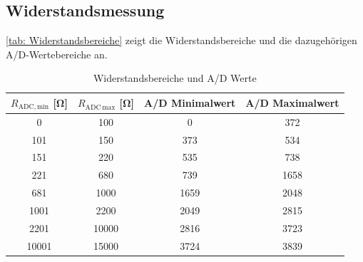 \subsection{Widerstandsmessung}
\autoref{tab: Widerstandsbereiche} zeigt die Widerstandsbereiche und die dazugehörigen A/D-Wertebereiche an.
\begin{table}[htb]
    \centering
    \caption{Widerstandsbereiche und A/D Werte}
    \label{tab: Widerstandsbereiche}
    \begin{tabular}{cccc}
        \toprule
        $R_{\text{ADC,}\,\text{min}}$ [\si{\ohm}]& $R_{\text{ADC}\, \text{max}}$  [\si{\ohm}] & A/D Minimalwert & A/D Maximalwert\\
        \midrule
        \num{0} & \num{100} & \num{0} & \num{372}\\
        \num{101} & \num{150} & \num{373} & \num{534}\\
        \num{151} & \num{220} & \num{535} & \num{738}\\
		\num{221} & \num{680} & \num{739} & \num{1658}\\
		\num{681} & \num{1000} & \num{1659} & \num{2048}\\
		\num{1001} & \num{2200} & \num{2049} & \num{2815}\\
		\num{2201} & \num{10000} & \num{2816} & \num{3723}\\
		\num{10001} & \num{15000} & \num{3724} & \num{3839}\\
        \bottomrule
    \end{tabular}
\end{table}

